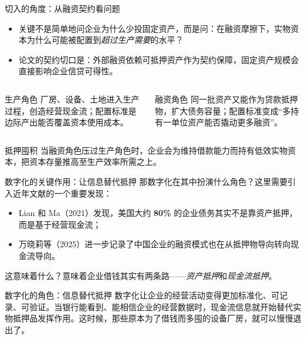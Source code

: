 \begin{frame}{切入的角度：从融资契约看问题}
  \footnotesize
  \begin{itemize}
    \item 关键不是简单地问企业为什么少投固定资产，而是问：在融资摩擦下，实物资本为什么可能被配置到\emph{超过生产需要}的水平？
    \item 论文的契约切口是：外部融资依赖可抵押资产作为契约保障，固定资产规模会直接影响企业信贷可得性。
  \end{itemize}

  \vspace{0.1em}
  \begin{columns}[T,onlytextwidth]
      \begin{methodbox}{生产角色}
        厂房、设备、土地进入生产过程，创造经营现金流；配置标准是边际产出能否覆盖资本使用成本。
      \end{methodbox}
      \begin{cautionbox}{融资角色}
        同一批资产又能作为贷款抵押物，扩大债务容量；配置标准变成“多持有一单位资产能否撬动更多融资”。
      \end{cautionbox}
  \end{columns}

  \vspace{0.15em}
  \begin{findingbox}{抵押囤积}
    当融资角色压过生产角色时，企业会为维持借款能力而持有低效实物资本，把资本存量推高至生产效率所需之上。
  \end{findingbox}
\end{frame}

\begin{frame}{数字化的关键作用：让信息替代抵押}
  那数字化在其中扮演什么角色？这里需要引入近年文献的一个重要发现：

  \begin{itemize}
    \item Lian 和 Ma（2021）发现，美国大约 \textbf{80\%} 的企业债务其实不是靠资产抵押，而是基于经营现金流；
    \item 万晓莉等（2025）进一步记录了中国企业的融资模式也在从抵押物导向转向现金流导向。
  \end{itemize}

  \vspace{0.4em}
  这意味着什么？意味着企业借钱其实有两条路——\emph{资产抵押}和\emph{现金流抵押}。

  \begin{findingbox}{数字化的角色：信息替代抵押}
    数字化让企业的经营活动变得更加标准化、可记录、可验证。当银行能看到、能相信企业的经营数据时，现金流信息就开始替代实物抵押品发挥作用。这时候，那些原本为了借钱而多囤的设备厂房，就可以慢慢退出了。
  \end{findingbox}
\end{frame}

